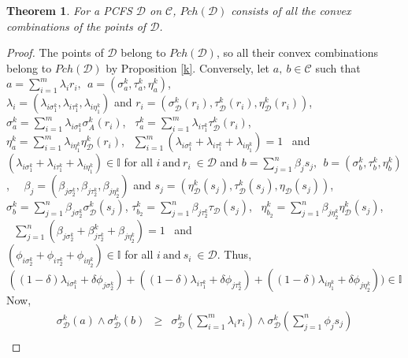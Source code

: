 \documentclass[12pt,letterpaper]{amsart}
\theoremstyle{plain}
\newtheorem{theorem}{Theorem}[section]
\theoremstyle{definition}
\numberwithin{equation}{section}
\begin{document}
\begin{theorem} 
For a PCFS $\mathcal{D}$ on $\mathcal{C}$, $Pch(\mathcal{D})$ consists of all the convex combinations of the points of $\mathcal{D}$.
\end{theorem}

\begin{proof}
The points of $\mathcal{D}$ belong to $Pch(\mathcal{D})$, so all their convex combinations belong to $Pch(\mathcal{D})$ by Proposition \ref{k}. Conversely, let $a,~ b \in \mathcal{C}$ such that $a = \sum \limits_{i=1}^{m} \lambda_{i} r_i,~~ a = ( \sigma^k_{a}, \tau^k_{a}, \eta^k_{a} )$,\\ $\lambda_i = ( \lambda_{i \sigma^k_1}, \lambda_{i \tau^k_1}, \lambda_{i \eta^k_1} )$ and $r_i =  (\sigma^k_{\mathcal{D}}(r_i), \tau^k_{\mathcal{D}}(r_i), \eta^k_{\mathcal{D}}(r_i))$, $\sigma^k_{a} = \sum \limits_{i=1}^{m} \lambda_{i \sigma^k_{1}} \sigma^k_{A}(r_i)$,~ $\tau^k_{a} = \sum \limits_{i=1}^{m} \lambda_{i \tau^k_{1}} \tau^k_{\mathcal{D}}(r_i)$,\\ $\eta^k_{a} = \sum \limits_{i=1}^{m} \lambda_{i \eta^k_{1}} \eta^k_{\mathcal{D}}(r_i)$, $~~\sum \limits_{i=1}^{m} (\lambda_{i \sigma^k_{1}} + \lambda_{i \tau^k_{1}} + \lambda_{i \eta^k_{1}}) = 1$~ and~ $(\lambda_{i \sigma^k_{1}} + \lambda_{i \tau^k_{1}} + \lambda_{i \eta^k_{1}}) \in \mathbb{I}$ for all $i~ \text{and}~ r_{i}~ \in \mathcal{D}$ and $b = \sum \limits_{j=1}^{n} \beta_{j} s_j,~~ b = ( \sigma^k_{b}, \tau^k_{b}, \eta^k_{b} )$,~~ $\beta_j = ( \beta_{j \sigma^k_{2}}, \beta_{j \tau^k_{2}}, \beta_{j \eta^k_{2}} )$ and $s_j = ( \eta^k_{\mathcal{D}}(s_j), \tau^k_{\mathcal{D}}(s_j), \eta_{\mathcal{D}}(s_j) )$,\\ $\sigma^k_{b} = \sum \limits_{j=1}^{n} \beta_{j \sigma^k_{2}} \sigma^k_{\mathcal{D}}(s_j)$, $\tau^k_{b_{2}} = \sum \limits_{j=1}^{n} \beta_{j \tau^k_{2}} \tau_{\mathcal{D}}(s_j)$,~ $\eta^k_{b_{2}} = \sum \limits_{j=1}^{n} \beta_{j \eta^k_{2}} \eta^k_{\mathcal{D}}(s_j)$, $~~~\sum \limits_{j=1}^{n} (\beta_{j \sigma^k_{2}} + \beta^k_{j \tau^k_{2}} +  \beta_{j \eta^k_{2}}) = 1$~ and\\ $(\phi_{i \sigma^k_{2}} + \phi_{i \tau^k_{2}} + \phi_{i \eta^k_{2}}) \in \mathbb{I}$ for all $i~ \text{and}~ s_{i}~ \in \mathcal{D}.$ Thus, 
$$((1 - \delta) \lambda_{i \sigma^k_{1}} + \delta \phi_{j \sigma^k_{2}}) + ((1 - \delta) \lambda_{i \tau^k_{1}} + \delta \phi_{j \tau^k_{2}}) + ((1 - \delta) \lambda_{i \eta^k_{1}} + \delta \phi_{j \eta^k_{2}})) \in \mathbb{I}$$ Now, 
\begin{eqnarray*}
\sigma^k_{\mathcal{D}}(a) \wedge \sigma^k_{\mathcal{D}}(b) & \geq & \sigma^k_{\mathcal{D}}(\sum \limits_{i=1}^{m} \lambda_{i} r_{i}) \wedge \sigma^k_{\mathcal{D}}(\sum \limits_{j=1}^{n} \phi_{j} s_{j})\\

\end{eqnarray*}
\end{proof}
\end{document}
